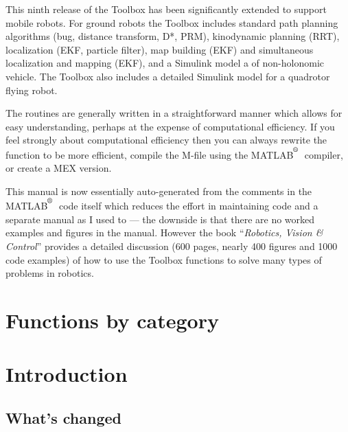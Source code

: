 \documentclass[a4paper]{report}
\def\Mlab{MATLAB$^{\textsuperscript{\textregistered}}$}
\begin{document}
This ninth release of the Toolbox has been significantly extended to support mobile robots.
For ground robots the Toolbox includes standard path planning algorithms (bug, distance transform, D*, PRM), kinodynamic planning (RRT),
localization (EKF, particle filter), map building (EKF) and simultaneous localization and mapping (EKF), and
a Simulink model a of non-holonomic vehicle.
The Toolbox also includes a detailed Simulink model for a quadrotor flying robot.

The routines are generally written in a straightforward manner which allows
for easy understanding, perhaps at the expense of computational efficiency.
If you feel strongly about computational efficiency then you can always
rewrite the function to be more efficient,
compile the M-file using the \Mlab\   compiler, or
create a MEX version.

This manual is now essentially auto-generated from the comments in the \Mlab\ code itself which reduces the effort
in maintaining code and a separate manual as I used to --- the downside is that there are no worked examples and figures in the manual.
However the book ``\textit{Robotics, Vision \& Control}''  provides a detailed discussion (600 pages, nearly 400 figures and 1000 code examples)
of how to use the Toolbox functions to
solve many types of problems in robotics.


\newpage
\tableofcontents
\newpage
\chapter*{Functions by category}
\begin{multicols}{2}

\end{multicols}
\newpage
\chapter{Introduction}
\section{What's changed}
\end{document}
